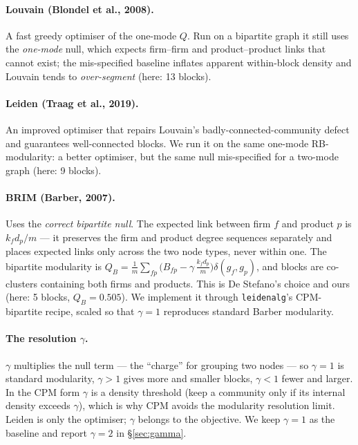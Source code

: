 \documentclass[11pt]{article}
\newcommand{\QB}{Q_B}
\begin{document}
\paragraph{Louvain (Blondel et al., 2008).} A fast greedy optimiser of the one-mode $Q$. Run on a bipartite
graph it still uses the \emph{one-mode} null, which expects firm--firm and product--product links that cannot
exist; the mis-specified baseline inflates apparent within-block density and Louvain tends to
\emph{over-segment} (here: 13 blocks).

\paragraph{Leiden (Traag et al., 2019).} An improved optimiser that repairs Louvain's badly-connected-community
defect and guarantees well-connected blocks. We run it on the same one-mode RB-modularity: a better optimiser,
but the same null mis-specified for a two-mode graph (here: 9 blocks).

\paragraph{BRIM (Barber, 2007).} Uses the \emph{correct bipartite null}. The expected link between firm $f$ and
product $p$ is $k_f d_p/m$ --- it preserves the firm and product degree sequences separately and places expected
links only across the two node types, never within one. The bipartite modularity is
$\QB=\frac{1}{m}\sum_{fp}\big(B_{fp}-\gamma\,\tfrac{k_f d_p}{m}\big)\delta(g_f,g_p)$, and blocks are co-clusters
containing both firms and products. This is De Stefano's choice and ours (here: 5 blocks, $\QB=0.505$). We
implement it through \texttt{leidenalg}'s CPM-bipartite recipe, scaled so that $\gamma=1$ reproduces standard
Barber modularity.

\paragraph{The resolution $\gamma$.} $\gamma$ multiplies the null term --- the ``charge'' for grouping two nodes
--- so $\gamma=1$ is standard modularity, $\gamma>1$ gives more and smaller blocks, $\gamma<1$ fewer and larger.
In the CPM form $\gamma$ is a density threshold (keep a community only if its internal density exceeds
$\gamma$), which is why CPM avoids the modularity resolution limit. Leiden is only the optimiser; $\gamma$
belongs to the objective. We keep $\gamma=1$ as the baseline and report $\gamma=2$ in \S\ref{sec:gamma}.
\end{document}
